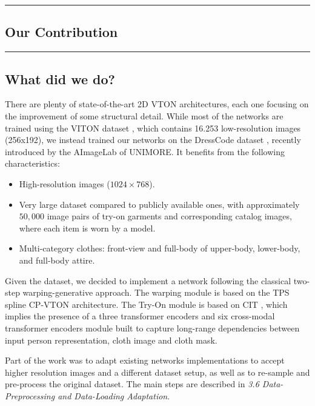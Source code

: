 {\color{gray}\hrule}
\begin{center}
\section{Our Contribution}
\end{center}
{\color{gray}\hrule}

\hfill

\subsection{What did we do?}
There are plenty of state-of-the-art 2D VTON architectures, each one focusing on the improvement of some structural detail. While most of the networks are trained using the VITON dataset \cite{viton}, which contains 16.253 low-resolution images (256x192), we instead trained our networks on the DressCode dataset \cite{dress-code}, recently introduced by the AImageLab of UNIMORE. It benefits from the following characteristics:

\begin{itemize}[noitemsep]

\item High-resolution images ($1024 \times 768$).

\item Very large dataset compared to publicly available ones, with approximately $50,000$ image pairs of try-on garments and corresponding catalog images, where each item is worn by a model.

\item Multi-category clothes: front-view and full-body of upper-body, lower-body, and full-body attire.

\end{itemize}

Given the dataset, we decided to implement a network following the classical two-step warping-generative approach. The warping module is based on the TPS spline CP-VTON architecture. The Try-On module is based on CIT \cite{CIT}, which implies the presence of a three transformer encoders and six cross-modal transformer encoders module built to capture long-range dependencies between input person representation, cloth image and cloth mask. 

Part of the work was to adapt existing networks implementations to accept higher resolution images and a different dataset setup, as well as to re-sample and pre-process the original dataset. The main steps are described in \textit{3.6 Data-Preprocessing and Data-Loading Adaptation}.

